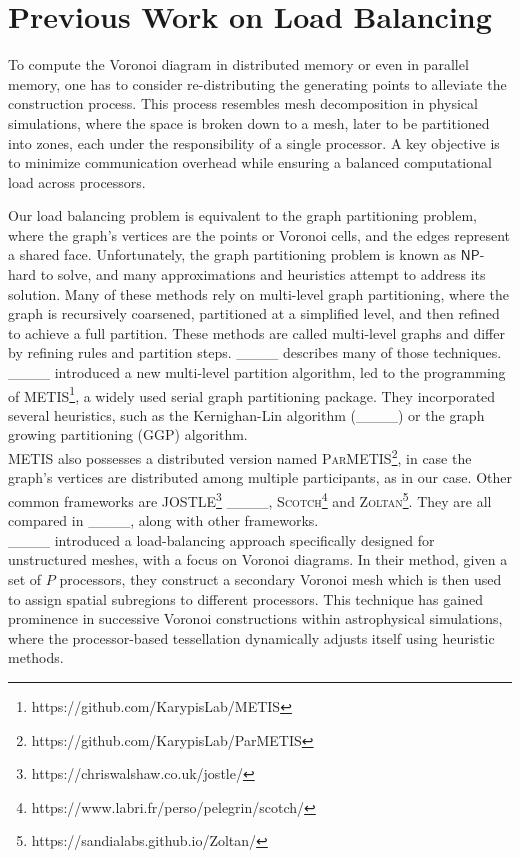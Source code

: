 \section{Previous Work on Load Balancing}
\label{litrature_load}
To compute the Voronoi diagram in distributed memory or even in parallel memory, one has to consider re-distributing the generating points to alleviate the construction process. This process resembles mesh decomposition in physical simulations, where the space is broken down to a mesh, later to be partitioned into zones, each under the responsibility of a single processor. A key objective is to minimize communication overhead while ensuring a balanced computational load across processors.

Our load balancing problem is equivalent to the graph partitioning problem, where the graph's vertices are the points or Voronoi cells, and the edges represent a shared face. Unfortunately, the graph partitioning problem is known as $\mathsf{NP}$-hard to solve, and many approximations and heuristics attempt to address its solution. Many of these methods rely on multi-level graph partitioning, where the graph is recursively coarsened, partitioned at a simplified level, and then refined to achieve a full partition. These methods are called multi-level graphs and differ by refining rules and partition steps. ____ describes many of those techniques. ____ introduced a new multi-level partition algorithm, led to the programming of \textsc{METIS}\footnote{https://github.com/KarypisLab/METIS}, a widely used serial graph partitioning package. They incorporated several heuristics, such as the Kernighan-Lin algorithm (____) or the graph growing partitioning (GGP) algorithm. \\
\textsc{METIS} also possesses a distributed version named \textsc{ParMETIS}\footnote{https://github.com/KarypisLab/ParMETIS}, in case the graph's vertices are distributed among multiple participants, as in our case.
Other common frameworks are \textsc{JOSTLE}\footnote{https://chriswalshaw.co.uk/jostle/} ____, \textsc{Scotch}\footnote{https://www.labri.fr/perso/pelegrin/scotch/} and \textsc{Zoltan}\footnote{https://sandialabs.github.io/Zoltan/}. They are all compared in ____, along with other frameworks. \\
____ introduced a load-balancing approach specifically designed for unstructured meshes, with a focus on Voronoi diagrams. In their method, given a set of $P$ processors, they construct a secondary Voronoi mesh which is then used to assign spatial subregions to different processors. This technique has gained prominence in successive Voronoi constructions within astrophysical simulations, where the processor-based tessellation dynamically adjusts itself using heuristic methods. \\
